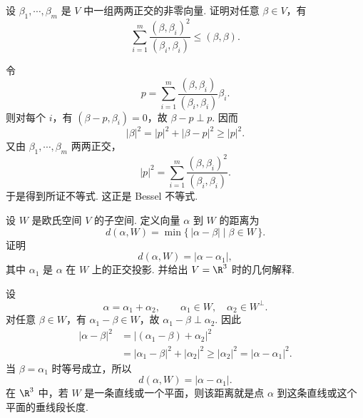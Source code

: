 \begin{problem}

	设 $\beta_1,\cdots,\beta_m$ 是 $V$ 中一组两两正交的非零向量. 证明对任意 $\beta\in V$，有
	\[
	\sum_{i=1}^m\frac{(\beta,\beta_i)^2}{(\beta_i,\beta_i)}\leqslant (\beta,\beta).
	\]
\end{problem}
\begin{solution}
	令
	\[
	p=\sum_{i=1}^m\frac{(\beta,\beta_i)}{(\beta_i,\beta_i)}\beta_i.
	\]
	则对每个 $i$，有 $(\beta-p,\beta_i)=0$，故 $\beta-p\perp p$. 因而
	\[
	|\beta|^2=|p|^2+|\beta-p|^2\geqslant |p|^2.
	\]
	又由 $\beta_1,\cdots,\beta_m$ 两两正交，
	\[
	|p|^2=\sum_{i=1}^m\frac{(\beta,\beta_i)^2}{(\beta_i,\beta_i)}.
	\]
	于是得到所证不等式. 这正是 Bessel 不等式.
\end{solution}

\begin{problem}

	\label{p1:concept:c6-l3040}设 $W$ 是欧氏空间 $V$ 的子空间. 定义向量 $\alpha$ 到 $W$ 的距离为
	\[
	d(\alpha,W)=\min\{\,|\alpha-\beta|\mid \beta\in W\,\}.
	\]
	证明
	\[
	d(\alpha,W)=|\alpha-\alpha_1|,
	\]
	其中 $\alpha_1$ 是 $\alpha$ 在 $W$ 上的正交投影. 并给出 $V=\R^3$ 时的几何解释.
\end{problem}
\begin{solution}
	设
	\[
	\alpha=\alpha_1+\alpha_2,
	\qquad \alpha_1\in W,
	\quad \alpha_2\in W^\perp.
	\]
	对任意 $\beta\in W$，有 $\alpha_1-\beta\in W$，故 $\alpha_1-\beta\perp \alpha_2$. 因此
	\[
	\begin{aligned}
		|\alpha-\beta|^2
		&=|(\alpha_1-\beta)+\alpha_2|^2 \\
		&=|\alpha_1-\beta|^2+|\alpha_2|^2
		\geqslant |\alpha_2|^2=|\alpha-\alpha_1|^2.
	\end{aligned}
	\]
	当 $\beta=\alpha_1$ 时等号成立，所以
	\[
	d(\alpha,W)=|\alpha-\alpha_1|.
	\]
	在 $\R^3$ 中，若 $W$ 是一条直线或一个平面，则该距离就是点 $\alpha$ 到这条直线或这个平面的垂线段长度.
\end{solution}

